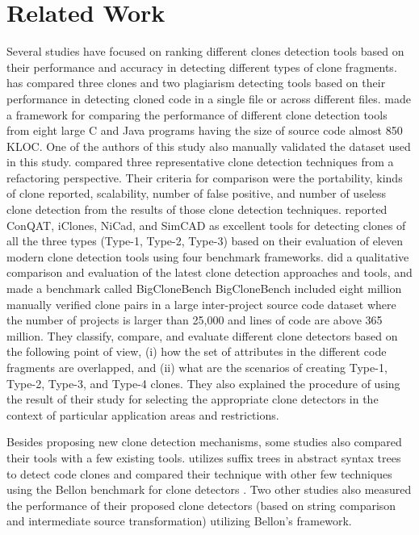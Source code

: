 \documentclass[review]{elsarticle}
\begin{document}
\vspace{2mm}
\section{Related Work}
\label{the-related-works}
Several studies \cite{Roy09comparisonand, jeff-evaluating, 4288192Comparison, ScenarioBasedComparison} have focused on ranking different clones detection tools based on their performance and accuracy in detecting different types of clone fragments. \citet{BaileyBurdComparison}  has compared three clones and two plagiarism detecting tools based on their performance in detecting cloned code in a single file or across different files. \citet{4288192Comparison} made a framework for comparing the performance of different clone detection tools from eight large C and Java programs having the size of source code almost 850 KLOC. One of the authors of this study also manually validated the dataset used in this study.  \citet{EvaluateRefactoring} compared three representative clone detection techniques from a refactoring perspective. Their criteria for comparison were the portability, kinds of clone reported, scalability, number of false positive, and number of useless clone detection from the results of those clone detection techniques. \citet{jeff-evaluating} reported ConQAT, iClones, NiCad, and SimCAD as excellent tools for detecting clones of all the three types (Type-1, Type-2, Type-3) based on their evaluation of eleven modern clone detection tools using four benchmark frameworks. \citet{Roy09comparisonand} did a qualitative comparison and evaluation of the latest clone detection approaches and tools, and made a benchmark called BigCloneBench \cite{BigCloneBenchCKRoyJRCordy} BigCloneBench included eight million manually verified clone pairs in a large inter-project source code dataset where the number of projects is larger than 25,000 and lines of code are above 365 million. They classify, compare, and evaluate different clone detectors based on the following point of view, (i) how the set of attributes in the different code fragments are overlapped, and (ii) what are the scenarios of creating Type-1, Type-2, Type-3, and Type-4 clones.  They also explained the procedure of using the result of their study for selecting the appropriate clone detectors in the context of particular application areas and restrictions. 

Besides proposing new clone detection mechanisms, some studies also compared their tools with a few existing tools. \citet{astDetectionComparisonBellon} utilizes suffix trees in abstract syntax trees to detect code clones and compared their technique with other few techniques using the Bellon benchmark for clone detectors \cite{DucasseStringMatchingCloneBallon}. Two other studies \cite{DucasseStringMatchingCloneBallon, CloneIntermediateRepresentationBallon} also measured the performance of their proposed clone detectors (based on string comparison and intermediate source transformation) utilizing Bellon’s framework. 
\end{document}
